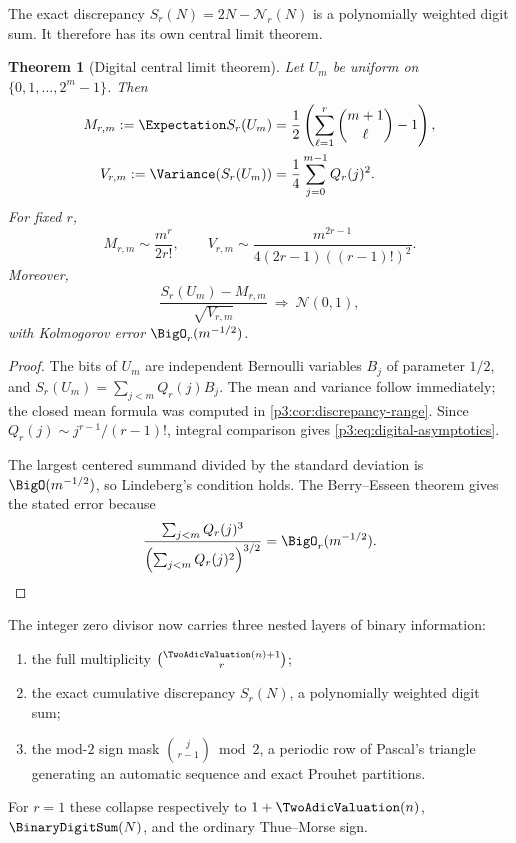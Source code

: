 \documentclass[11pt,oneside]{article}
\newtheorem{theorem}{Theorem}[section]
\theoremstyle{definition}
\theoremstyle{remark}
\begin{document}
The exact discrepancy $S_r(N)=2N-\mathcal N_r(N)$ is a polynomially weighted digit sum.  It therefore has its own central limit theorem.

\begin{theorem}[Digital central limit theorem]\label{p3:thm:digital-clt}
Let $U_m$ be uniform on $\{0,1,\ldots,2^m-1\}$.  Then
\begin{align}
 M_{r,m}:=\Expectation S_r(U_m)
 &=\frac12\left(\sum_{\ell=1}^{r}\binom{m+1}{\ell}-1\right),\label{p3:eq:digital-mean}\\
 V_{r,m}:=\Variance(S_r(U_m))
 &=\frac14\sum_{j=0}^{m-1}Q_r(j)^2.\label{p3:eq:digital-var}
\end{align}
For fixed $r$,
\begin{equation}\label{p3:eq:digital-asymptotics}
 M_{r,m}\sim\frac{m^r}{2r!},
 \qquad
 V_{r,m}\sim
 \frac{m^{2r-1}}{4(2r-1)((r-1)!)^2}.
\end{equation}
Moreover,
\begin{equation}\label{p3:eq:digital-clt}
 \frac{S_r(U_m)-M_{r,m}}{\sqrt{V_{r,m}}}
 \ \Longrightarrow\ \mathcal N(0,1),
\end{equation}
with Kolmogorov error $\BigO_r(m^{-1/2})$.
\end{theorem}

\begin{proof}
The bits of $U_m$ are independent Bernoulli variables $B_j$ of parameter $1/2$, and
$S_r(U_m)=\sum_{j<m}Q_r(j)B_j$.  The mean and variance follow immediately; the closed mean formula was computed in \cref{p3:cor:discrepancy-range}.  Since
$Q_r(j)\sim j^{r-1}/(r-1)!$, integral comparison gives \eqref{p3:eq:digital-asymptotics}.

The largest centered summand divided by the standard deviation is $\BigO(m^{-1/2})$, so Lindeberg's condition holds.  The Berry--Esseen theorem \cite{p3:feller} gives the stated error because
\[
 \frac{\sum_{j<m}Q_r(j)^3}{\left(\sum_{j<m}Q_r(j)^2\right)^{3/2}}
 =\BigO_r(m^{-1/2}).
\]
\end{proof}

\begin{resultbox}
The integer zero divisor now carries three nested layers of binary information:
\begin{enumerate}[label=\arabic*.]
\item the full multiplicity $\binom{\TwoAdicValuation(n)+1}{r}$;
\item the exact cumulative discrepancy $S_r(N)$, a polynomially weighted digit sum;
\item the mod-$2$ sign mask $\binom j{r-1}\bmod2$, a periodic row of Pascal's triangle generating an automatic sequence and exact Prouhet partitions.
\end{enumerate}
For $r=1$ these collapse respectively to $1+\TwoAdicValuation(n)$, $\BinaryDigitSum(N)$, and the ordinary Thue--Morse sign.
\end{resultbox}
\end{document}
